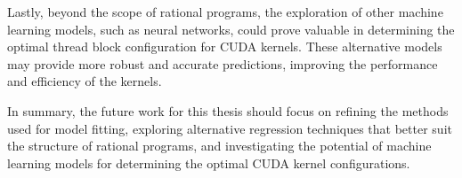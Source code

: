 Lastly, beyond the scope of rational programs, the exploration of other machine learning models, such as neural networks, 
could prove valuable in determining the optimal thread block configuration for CUDA kernels. These alternative models may 
provide more robust and accurate predictions, improving the performance and efficiency of the kernels.

In summary, the future work for this thesis should focus on refining the methods used for model fitting, exploring 
alternative regression techniques that better suit the structure of rational programs, and investigating the potential 
of machine learning models for determining the optimal CUDA kernel configurations.


